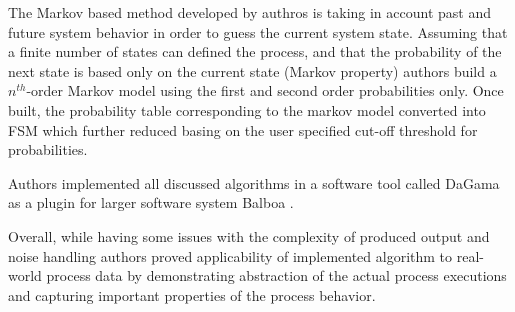 The Markov based method developed by authros is taking in account past and future system behavior in order to guess the current system state. Assuming that a finite number of states can defined the process, and that the probability of the next state is based only on the current state (Markov property) authors build a $n^{th}$-order Markov model using the first and second order probabilities only. Once built, the probability table corresponding to the markov model converted into FSM which further reduced basing on the user specified cut-off threshold for probabilities.

Authors implemented all discussed algorithms in a software tool called DaGama as a plugin for larger software system Balboa \cite{citeulike:5120757}. 

Overall, while having some issues with the complexity of produced output and noise handling authors proved applicability of implemented algorithm to real-world process data by demonstrating abstraction of the actual process executions and capturing important properties of the process behavior.